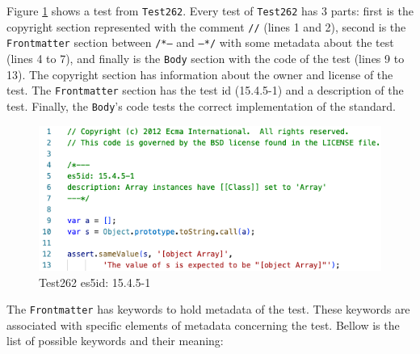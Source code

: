 \documentclass[runningheads]{llncs}
\begin{document}
Figure \ref{fig:Test262_example} shows a test from \texttt{Test262}. Every test of \texttt{Test262} has 3 parts: first is the copyright section represented with the comment \texttt{//} (lines 1 and 2), second is the \texttt{Frontmatter} section between \texttt{/*---} and \texttt{---*/} with some metadata about the test (lines 4 to 7), and finally is the \texttt{Body} section with the code of the test (lines 9 to 13). The copyright section has information about the owner and license of the test. The \texttt{Frontmatter} section has the test id (15.4.5-1) and a description of the test. Finally, the \texttt{Body}'s code tests the correct implementation of the standard.

\begin{figure}[ht]
    \centering
    \includegraphics[width=1.0\textwidth]{images/test262_array_test.png}
    \caption{Test262 es5id: 15.4.5-1}
    \label{fig:Test262_example}
\end{figure}



The \texttt{Frontmatter} has keywords to hold metadata of the test. These keywords are associated with specific elements of metadata concerning the test. Bellow is the list of possible keywords and their meaning:
\end{document}

